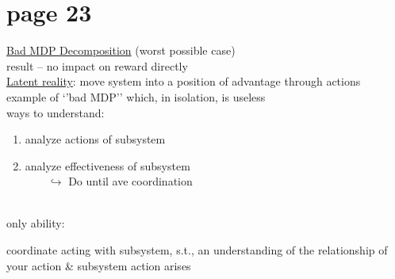 \section{page 23}

\underline{Bad MDP Decomposition} (worst possible case)\\

result -- no impact on reward directly\\

\underline{Latent reality}: move system into a position of advantage through actions\\

example of `'bad MDP'' which, in isolation, is useless\\


ways to understand:
$\qquad$ \begin{minipage}[t]{\linegoal}
\begin{enumerate}[label=\arabic*)]
\item analyze actions of subsystem

\item analyze effectiveness of subsystem\\
$\qquad\hookrightarrow$ Do until ave coordination
\end{enumerate}
\end{minipage}\\

only ability: \parbox[t]{\linegoal}{coordinate acting with subsystem, s.t., an understanding of the relationship of your action \& subsystem action arises}
